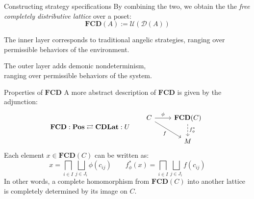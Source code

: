 \documentclass[aspectratio=54]{beamer}
\begin{document}
%
%

\begin{frame}[fragile]{Constructing strategy specifications} %
By combining the two,
we obtain the
the \emph{free completely distributive lattice} over a poset:
\[
  \mathbf{FCD}(A) := \mathcal{U}(\mathcal{D}(A))
\]

The inner layer corresponds to traditional angelic strategies,
ranging over permissible behaviors of the environment.

The outer layer adds demonic nondeterminism, \\
ranging over permissible behaviors of the system.
\end{frame}

\begin{frame}[fragile]{Properties of $\mathbf{FCD}$} %
A more abstract description of $\mathbf{FCD}$
is given by the adjunction:
\[
  \mathbf{FCD} : \mathbf{Pos} \rightleftarrows \mathbf{CDLat} : U
  \qquad
  \begin{tikzcd}
    C \arrow[r, "\phi"] \arrow[rd, "f"'] &
    \mathbf{FCD}(C) \arrow[d, "f^*_\phi", dashed] \\ & M
  \end{tikzcd}
\]
Each element $x \in \mathbf{FCD}(C)$ can be written as:
\[
  x = \bigsqcap_{i \in I} \bigsqcup_{j \in J_i} \phi(c_{ij})
  \qquad
  f^*_\phi(x) = \bigsqcap_{i \in I} \bigsqcup_{j \in J_i} f(c_{ij})
\]
In other words,
a complete homomorphism from $\mathbf{FCD}(C)$ into another lattice
is completely determined by its image on $C$.
\end{frame}
\end{document}
